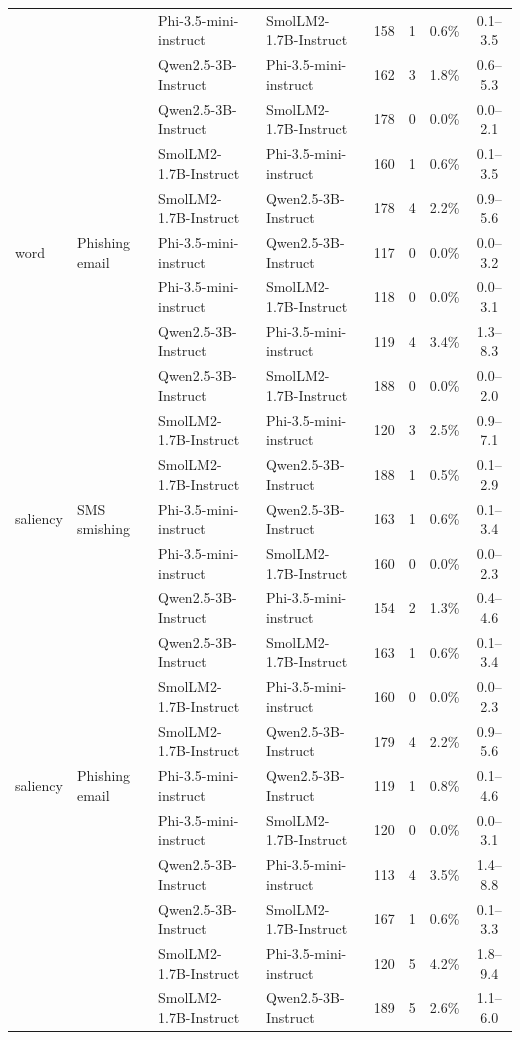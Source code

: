 \begin{table}[t]
\begin{tabular}{llllcccc}
  &  & Phi-3.5-mini-instruct & SmolLM2-1.7B-Instruct & 158 & 1 & 0.6\% & 0.1--3.5 \\
  &  & Qwen2.5-3B-Instruct & Phi-3.5-mini-instruct & 162 & 3 & 1.8\% & 0.6--5.3 \\
  &  & Qwen2.5-3B-Instruct & SmolLM2-1.7B-Instruct & 178 & 0 & 0.0\% & 0.0--2.1 \\
  &  & SmolLM2-1.7B-Instruct & Phi-3.5-mini-instruct & 160 & 1 & 0.6\% & 0.1--3.5 \\
  &  & SmolLM2-1.7B-Instruct & Qwen2.5-3B-Instruct & 178 & 4 & 2.2\% & 0.9--5.6 \\
 word & Phishing email & Phi-3.5-mini-instruct & Qwen2.5-3B-Instruct & 117 & 0 & 0.0\% & 0.0--3.2 \\
  &  & Phi-3.5-mini-instruct & SmolLM2-1.7B-Instruct & 118 & 0 & 0.0\% & 0.0--3.1 \\
  &  & Qwen2.5-3B-Instruct & Phi-3.5-mini-instruct & 119 & 4 & 3.4\% & 1.3--8.3 \\
  &  & Qwen2.5-3B-Instruct & SmolLM2-1.7B-Instruct & 188 & 0 & 0.0\% & 0.0--2.0 \\
  &  & SmolLM2-1.7B-Instruct & Phi-3.5-mini-instruct & 120 & 3 & 2.5\% & 0.9--7.1 \\
  &  & SmolLM2-1.7B-Instruct & Qwen2.5-3B-Instruct & 188 & 1 & 0.5\% & 0.1--2.9 \\
\midrule
 saliency & SMS smishing & Phi-3.5-mini-instruct & Qwen2.5-3B-Instruct & 163 & 1 & 0.6\% & 0.1--3.4 \\
  &  & Phi-3.5-mini-instruct & SmolLM2-1.7B-Instruct & 160 & 0 & 0.0\% & 0.0--2.3 \\
  &  & Qwen2.5-3B-Instruct & Phi-3.5-mini-instruct & 154 & 2 & 1.3\% & 0.4--4.6 \\
  &  & Qwen2.5-3B-Instruct & SmolLM2-1.7B-Instruct & 163 & 1 & 0.6\% & 0.1--3.4 \\
  &  & SmolLM2-1.7B-Instruct & Phi-3.5-mini-instruct & 160 & 0 & 0.0\% & 0.0--2.3 \\
  &  & SmolLM2-1.7B-Instruct & Qwen2.5-3B-Instruct & 179 & 4 & 2.2\% & 0.9--5.6 \\
 saliency & Phishing email & Phi-3.5-mini-instruct & Qwen2.5-3B-Instruct & 119 & 1 & 0.8\% & 0.1--4.6 \\
  &  & Phi-3.5-mini-instruct & SmolLM2-1.7B-Instruct & 120 & 0 & 0.0\% & 0.0--3.1 \\
  &  & Qwen2.5-3B-Instruct & Phi-3.5-mini-instruct & 113 & 4 & 3.5\% & 1.4--8.8 \\
  &  & Qwen2.5-3B-Instruct & SmolLM2-1.7B-Instruct & 167 & 1 & 0.6\% & 0.1--3.3 \\
  &  & SmolLM2-1.7B-Instruct & Phi-3.5-mini-instruct & 120 & 5 & 4.2\% & 1.8--9.4 \\
  &  & SmolLM2-1.7B-Instruct & Qwen2.5-3B-Instruct & 189 & 5 & 2.6\% & 1.1--6.0 \\
\bottomrule
\end{tabular}
\end{table}
